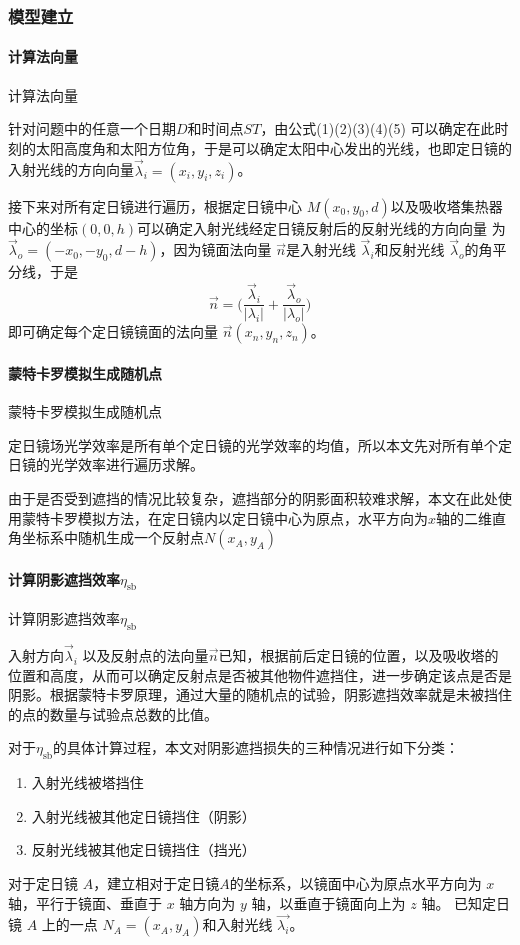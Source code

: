 \documentclass[../main.tex]{subfiles}
\begin{document}
\subsubsection{模型建立}
\paragraph{计算法向量}
计算法向量

针对问题中的任意一个日期\(D\)和时间点\(ST\)，由公式(1)(2)(3)(4)(5)
可以确定在此时刻的太阳高度角和太阳方位角，于是可以确定太阳中心发出的光线，也即定日镜的入射光线的方向向量\(\vec \lambda_i=(x_i,y_i,z_i)\)。

接下来对所有定日镜进行遍历，根据定日镜中心
\(M(x_0,y_0,d)\)以及吸收塔集热器中心的坐标\((0,0,h)\)可以确定入射光线经定日镜反射后的反射光线的方向向量
为 \(\vec \lambda_o  = (−x_0,−y_0, d −h)\)，因为镜面法向量 \(\vec n\)是入射光线 \(\vec \lambda _{i}\)和反射光线 \(\vec \lambda _{o}\)的角平分线，于是
\begin{equation}
\vec n = \big(\frac{\vec \lambda_{i}}{\vert \lambda_{i} \vert} + \frac{\vec \lambda_{o}}{\vert \lambda_{o} \vert}\big)
\end{equation}
即可确定每个定日镜镜面的法向量 \(\vec n (x_{n}, y_{n}, z_{n})\)。

\paragraph{蒙特卡罗模拟生成随机点}
蒙特卡罗模拟生成随机点

定日镜场光学效率是所有单个定日镜的光学效率的均值，所以本文先对所有单个定日镜的光学效率进行遍历求解。

由于是否受到遮挡的情况比较复杂，遮挡部分的阴影面积较难求解，本文在此处使用蒙特卡罗模拟方法，在定日镜内以定日镜中心为原点，水平方向为\(x\)轴的二维直角坐标系中随机生成一个反射点\(N(x_A,y_A)\)

\paragraph{计算阴影遮挡效率\(\eta_{\mathrm{s b}}\)}
计算阴影遮挡效率\(\eta_{\mathrm{s b}}\)

入射方向\(\vec \lambda _{i}\) 以及反射点的法向量\(\vec n\)已知，根据前后定日镜的位置，以及吸收塔的位置和高度，从而可以确定反射点是否被其他物件遮挡住，进一步确定该点是否是阴影。根据蒙特卡罗原理，通过大量的随机点的试验，阴影遮挡效率就是未被挡住的点的数量与试验点总数的比值。

对于\(\eta _{\mathrm{s b}}\)的具体计算过程，本文对阴影遮挡损失的三种情况进行如下分类：
\begin{enumerate}
\item 入射光线被塔挡住
\item 入射光线被其他定日镜挡住（阴影）
\item 反射光线被其他定日镜挡住（挡光）
\end{enumerate}
对于定日镜 \(A\)，建立相对于定日镜\(A\)的坐标系，以镜面中心为原点水平方向为 \(x\) 轴，平行于镜面、垂直于 \(x\) 轴方向为 \(y\) 轴，以垂直于镜面向上为 \(z\) 轴。
已知定日镜 \(A\) 上的一点 \(N_{A} = (x_{A}, y_{A})\)和入射光线 \(\vec {\lambda _{i}}\)。
\end{document}
